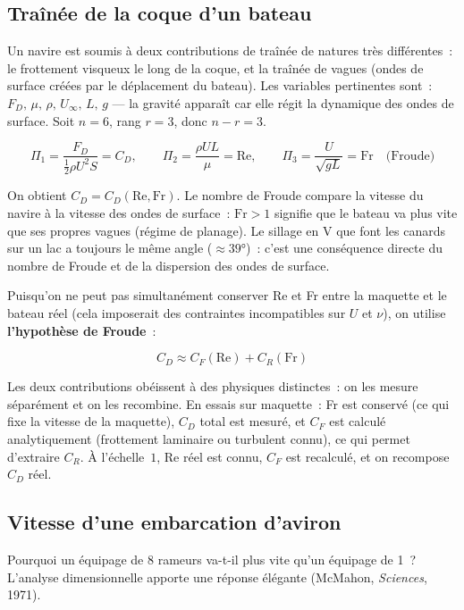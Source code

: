 \documentclass[11pt,a4paper]{report}
\begin{document}
\subsection{Traînée de la coque d'un bateau}

Un navire est soumis à deux contributions de traînée de natures très différentes~:
le frottement visqueux le long de la coque, et la traînée de vagues (ondes de
surface créées par le déplacement du bateau). Les variables pertinentes sont~:
$F_D,\,\mu,\,\rho,\,U_\infty,\,L,\,g$ --- la gravité apparaît car elle régit
la dynamique des ondes de surface. Soit $n=6$, rang $r=3$, donc $n-r=3$.

\[
    \Pi_1 = \frac{F_D}{\frac{1}{2}\rho U^2 S} = C_D, \qquad
    \Pi_2 = \frac{\rho U L}{\mu} = \mathrm{Re}, \qquad
    \Pi_3 = \frac{U}{\sqrt{gL}} = \mathrm{Fr} \quad \text{(Froude)}
\]

On obtient $C_D = C_D(\mathrm{Re}, \mathrm{Fr})$. Le nombre de Froude compare
la vitesse du navire à la vitesse des ondes de surface~: $\mathrm{Fr} > 1$
signifie que le bateau va plus vite que ses propres vagues (régime de
planage). Le sillage en V que font les canards sur un lac a toujours
le même angle ($\approx 39°$)~: c'est une conséquence directe du nombre
de Froude et de la dispersion des ondes de surface.

Puisqu'on ne peut pas simultanément conserver Re et Fr entre la maquette
et le bateau réel (cela imposerait des contraintes incompatibles sur $U$
et $\nu$), on utilise \textbf{l'hypothèse de Froude}~:

\[
    C_D \approx C_F(\mathrm{Re}) + C_R(\mathrm{Fr})
\]

Les deux contributions obéissent à des physiques distinctes~: on les mesure
séparément et on les recombine. En essais sur maquette~: Fr est conservé
(ce qui fixe la vitesse de la maquette), $C_D$ total est mesuré, et $C_F$ est
calculé analytiquement (frottement laminaire ou turbulent connu), ce qui
permet d'extraire $C_R$. À l'échelle~$1$, Re réel est connu, $C_F$ est
recalculé, et on recompose $C_D$ réel.

\subsection{Vitesse d'une embarcation d'aviron}

Pourquoi un équipage de 8 rameurs va-t-il plus vite qu'un équipage de 1~?
L'analyse dimensionnelle apporte une réponse élégante (McMahon, \textit{Sciences}, 1971).
\end{document}
